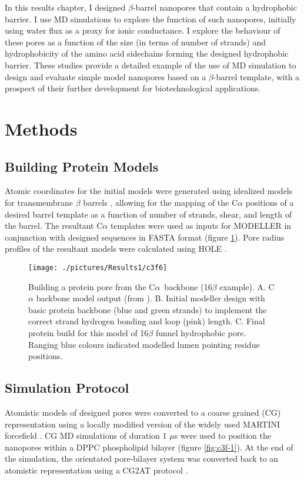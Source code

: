 In this results chapter, I designed $\beta$-barrel nanopores that contain a hydrophobic barrier. I use MD simulations to explore the function of such nanopores, initially using water flux as a proxy for ionic conductance. I explore the behaviour of these pores as a function of the size (in terms of number of strands) and hydrophobicity of the amino acid sidechains forming the designed hydrophobic barrier.  These studies provide a detailed example of the use of MD simulation to design and evaluate simple model nanopores based on a $\beta$-barrel template, with a prospect of their further development for biotechnological applications. 


\section{Methods}

\subsection{Building Protein Models}
Atomic coordinates for the initial models were generated using idealized models for transmembrane $\beta$ barrels \cite{Sansom1995}, allowing for the mapping of the C$\alpha$ positions of a desired barrel template as a function of number of strands, shear, and length of the barrel. The resultant C$\alpha$ templates were used as inputs for MODELLER \cite{Sali1993} in conjunction with designed sequences in FASTA format (figure \ref{fig:c3f6}). Pore radius profiles of the resultant models were calculated using HOLE \cite{Smart1996}.

\begin{figure}[H]
\begin{center}
\texttt{[image: ./pictures/Results1/c3f6]}
\caption[Building a protein pore from the C$\alpha$\ backbone (16$\beta$ example).] {Building a protein pore from the C$\alpha$\ backbone (16$\beta$ example). A. C$\alpha$ backbone model output (from \cite{Sansom1995}). B. Initial modeller design with basic protein backbone (blue and green strands) to implement the correct strand hydrogen bonding and loop (pink) length. C. Final protein build for this model of 16$\beta$ funnel hydrophobic pore. Ranging blue colours indicated modelled lumen pointing residue positions.}
\label{fig:c3f6}
\end{center}
\end{figure}


\subsection{Simulation Protocol}
Atomistic models of designed pores were converted to a coarse grained (CG) representation using a locally modified version of the widely used MARTINI forcefield \cite{Bond2006}. CG MD simulations of duration 1 $\mu$s were used to position the nanopores within a DPPC phospholipid  bilayer (figure \ref{fig:c3f-1}). At the end of the simulation, the orientated pore-bilayer system was converted back to an atomistic representation using a CG2AT protocol \cite{Stansfeld2011}. 
 
